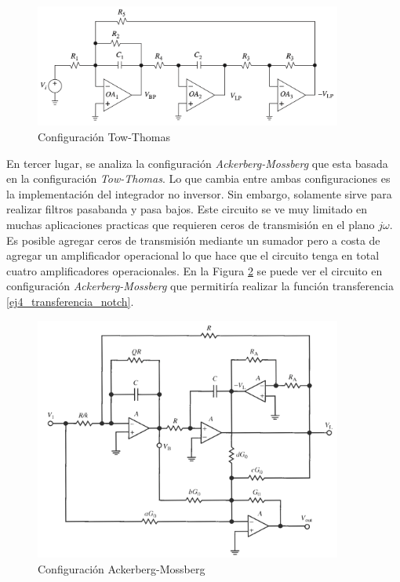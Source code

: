 \begin{figure}[h!]                                                       
    \centering\includegraphics[width=0.9\textwidth]{../Ex4/Resources/Tow_Thomas.png}
    \caption{Configuración Tow-Thomas}
    \label{fig:Tow-Thomas}
    \end{figure}

En tercer lugar, se analiza la configuración \textit{Ackerberg-Mossberg} que esta basada en la configuración \textit{Tow-Thomas}. Lo que cambia entre ambas configuraciones es la implementación del integrador no inversor. Sin embargo, solamente  sirve para realizar filtros pasabanda y pasa bajos. Este circuito se ve muy limitado en muchas aplicaciones practicas que requieren ceros de transmisión en el plano $j\omega$. Es posible agregar ceros de transmisión mediante un sumador pero a costa de agregar un amplificador operacional lo que hace que el circuito tenga en total cuatro amplificadores operacionales. En la Figura \ref{fig:Ackerberg-Mossberg} se puede ver el circuito en configuración \textit{Ackerberg-Mossberg} que permitiría realizar la función transferencia \ref{ej4_transferencia_notch}. 

\begin{figure}[h!]                                                       
    \centering\includegraphics[width=0.9\textwidth]{../Ex4/Resources/Ackerberg_Mossberg.png}
    \caption{Configuración Ackerberg-Mossberg}
    \label{fig:Ackerberg-Mossberg}
    \end{figure}

